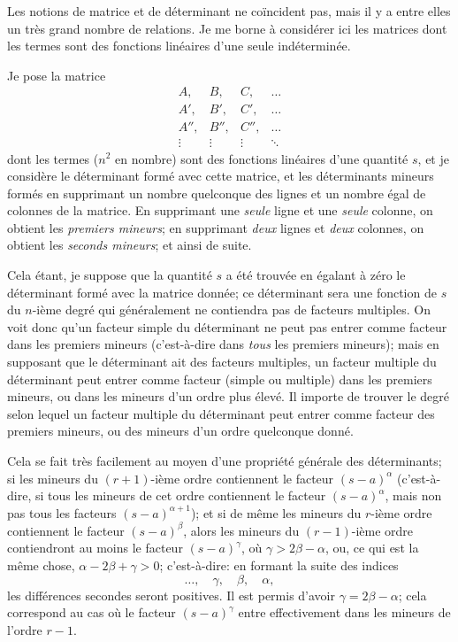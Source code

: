 \documentclass[12pt,a4paper]{article}
\begin{document}
Les notions de matrice et de d\'{e}terminant ne co\"{i}ncident pas, mais il y a entre elles un tr\`{e}s grand nombre de relations. Je me borne \`{a} consid\'{e}rer ici les matrices dont les termes sont des fonctions lin\'{e}aires d'une seule ind\'{e}termin\'{e}e.

Je pose la matrice
\[
\begin{matrix}
A, & B, & C, & \ldots \\
A', & B', & C', & \ldots \\
A'', & B'', & C'', & \ldots \\
\vdots & \vdots & \vdots & \ddots
\end{matrix}
\]
dont les termes ($n^2$ en nombre) sont des fonctions lin\'{e}aires d'une quantit\'{e} $s$, et je consid\`{e}re le d\'{e}terminant form\'{e} avec cette matrice, et les d\'{e}terminants mineurs form\'{e}s en supprimant un nombre quelconque des lignes et un nombre \'{e}gal de colonnes de la matrice. En supprimant une \textit{seule} ligne et une \textit{seule} colonne, on obtient les \textit{premiers mineurs}; en supprimant \textit{deux} lignes et \textit{deux} colonnes, on obtient les \textit{seconds mineurs}; et ainsi de suite.

Cela \'{e}tant, je suppose que la quantit\'{e} $s$ a \'{e}t\'{e} trouv\'{e}e en \'{e}galant \`{a} z\'{e}ro le d\'{e}terminant form\'{e} avec la matrice donn\'{e}e; ce d\'{e}terminant sera une fonction de $s$ du $n$-i\`{e}me degr\'{e} qui g\'{e}n\'{e}ralement ne contiendra pas de facteurs multiples. On voit donc qu'un facteur simple du d\'{e}terminant ne peut pas entrer comme facteur dans les premiers mineurs (c'est-\`{a}-dire dans \textit{tous} les premiers mineurs); mais en supposant que le d\'{e}terminant ait des facteurs multiples, un facteur multiple du d\'{e}terminant peut entrer comme facteur (simple ou multiple) dans les premiers mineurs, ou dans les mineurs d'un ordre plus \'{e}lev\'{e}. Il importe de trouver le degr\'{e} selon lequel un facteur multiple du d\'{e}terminant peut entrer comme facteur des premiers mineurs, ou des mineurs d'un ordre quelconque donn\'{e}.

Cela se fait tr\`{e}s facilement au moyen d'une propri\'{e}t\'{e} g\'{e}n\'{e}rale des d\'{e}terminants; si les mineurs du $(r+1)$-i\`{e}me ordre contiennent le facteur $(s-a)^{\alpha}$ (c'est-\`{a}-dire, si tous les mineurs de cet ordre contiennent le facteur $(s-a)^{\alpha}$, mais non pas tous les facteurs $(s-a)^{\alpha+1}$); et si de m\^{e}me les mineurs du $r$-i\`{e}me ordre contiennent le facteur $(s-a)^{\beta}$, alors les mineurs du $(r-1)$-i\`{e}me ordre contiendront au moins le facteur $(s-a)^{\gamma}$, o\`{u} $\gamma > 2\beta - \alpha$, ou, ce qui est la m\^{e}me chose, $\alpha - 2\beta + \gamma > 0$; c'est-\`{a}-dire: en formant la suite des indices
\[
\ldots,\quad \gamma,\quad \beta,\quad \alpha,
\]
les diff\'{e}rences secondes seront positives. Il est permis d'avoir $\gamma = 2\beta - \alpha$; cela correspond au cas o\`{u} le facteur $(s-a)^{\gamma}$ entre effectivement dans les mineurs de l'ordre $r-1$.
\end{document}
